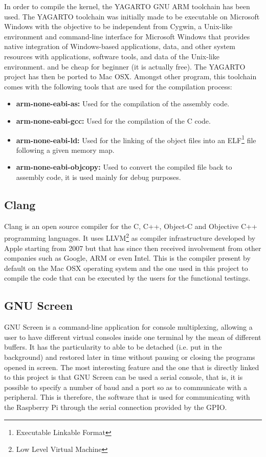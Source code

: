 In order to compile the kernel, the YAGARTO GNU ARM toolchain\cite{yagarto} has been used. The YAGARTO toolchain was initially made to be executable on Microsoft Windows with the objective to be independent from Cygwin\cite{cygwin}, a Unix-like environment and command-line interface for Microsoft Windows that provides native integration of Windows-based applications, data, and other system resources with applications, software tools, and data of the Unix-like environment. and be cheap for beginner (it is actually free). The YAGARTO project has then be ported to Mac OSX. Amongst other program, this toolchain comes with the following tools that are used for the compilation process:
\begin{itemize}
\item \textbf{arm-none-eabi-as:} Used for the compilation of the assembly code.
\item \textbf{arm-none-eabi-gcc:} Used for the compilation of the C code.
\item \textbf{arm-none-eabi-ld:} Used for the linking of the object files into an ELF\footnote{Executable Linkable Format} file following a given memory map.
\item \textbf{arm-none-eabi-objcopy:} Used to convert the compiled file back to assembly code, it is used mainly for debug purposes.
\end{itemize}


\subsection{Clang}

Clang is an open source compiler for the C, C++, Object-C and Objective C++ programming languages. It uses LLVM\footnote{Low Level Virtual Machine}\cite{llvm} as compiler infrastructure developed by Apple starting from 2007 but that has since then received involvement from other companies such as Google, ARM or even Intel. This is the compiler present by default on the Mac OSX operating system and the one used in this project to compile the code that can be executed by the users for the functional testings. 


\subsection{GNU Screen}

GNU Screen is a command-line application for console multiplexing, allowing a user to have different virtual consoles inside one terminal by the mean of different buffers. It has the particularity to able to be detached (i.e. put in the background) and restored later in time without pausing or closing the programs opened in screen. 
The most interesting feature and the one that is directly linked to this project is that GNU Screen can be used a serial console, that is, it is possible to specify a number of baud and a port so as to communicate with a peripheral. This is therefore, the software that is used for communicating with the Raspberry Pi through the serial connection provided by the GPIO. 


